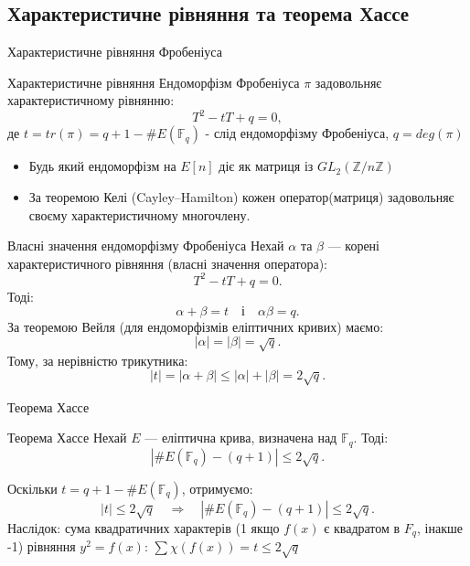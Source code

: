 \documentclass[9pt]{beamer}
\begin{document}
\begin{darkframes}
\section{Характеристичне рівняння та теорема Хассе}
\begin{frame}{Характеристичне рівняння Фробеніуса}
  \begin{block}{Характеристичне рівняння}
    Ендоморфізм Фробеніуса \(\pi\) задовольняє характеристичному рівнянню:
    \[
    T^2 - tT + q = 0,
    \]
    де
    \(
    t = tr(\pi) = q+1 - \#E(\mathbb{F}_q)
    \) - слід ендоморфізму Фробеніуса, $q=deg(\pi)$
  \end{block}
  \vspace{0.3cm}
  \begin{itemize}
    \item Будь який ендоморфізм на $E[n]$ діє як матриця із $GL_2(\mathbb{Z}/n\mathbb{Z})$
    \item За теоремою Келі (Cayley–Hamilton) кожен оператор(матриця) задовольняє своєму характеристичному многочлену.
    
  \end{itemize}
\end{frame}

\begin{frame}{Власні значення ендоморфізму Фробеніуса}
  Нехай \(\alpha\) та \(\beta\) --- корені характеристичного рівняння (власні значення оператора):
  \[
  T^2 - tT + q = 0.
  \]
  Тоді:
  \[
  \alpha + \beta = t \quad\text{і}\quad \alpha\beta = q.
  \]
  \vspace{0.3cm}
  За теоремою Вейля (для ендоморфізмів еліптичних кривих) маємо:
  \[
  |\alpha| = |\beta| = \sqrt{q}.
  \]
  Тому, за нерівністю трикутника:
  \[
  |t| = |\alpha+\beta| \le |\alpha| + |\beta| = 2\sqrt{q}.
  \]
\end{frame}

\begin{frame}{Теорема Хассе}
  \begin{block}{Теорема Хассе}
    Нехай \(E\) --- еліптична крива, визначена над \(\mathbb{F}_q\). Тоді:
    \[
    \left|\#E(\mathbb{F}_q) - (q+1)\right| \le 2\sqrt{q}.
    \]
  \end{block}
  \vspace{0.3cm}
  Оскільки \(t = q+1-\#E(\mathbb{F}_q)\), отримуємо:
  \[
  |t| \le 2\sqrt{q} \quad \Longrightarrow \quad \left|\#E(\mathbb{F}_q) - (q+1)\right| \le 2\sqrt{q}.
  \]
  Наслідок: сума квадратичних характерів (1 якщо $f(x)$ є квадратом в $F_q$, інакше -1) рівняння $y^2=f(x)$: $\sum{\chi(f(x))} = t \le 2\sqrt{q}$
\end{frame}


\end{darkframes}
\end{document}
